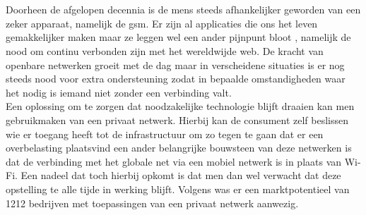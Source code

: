 
\chapter{}%
\label{ch:inleiding}

Doorheen de afgelopen decennia is de mens steeds afhankelijker geworden van een zeker apparaat, namelijk de gsm. Er zijn al applicaties die ons het leven gemakkelijker maken maar ze leggen wel een ander pijnpunt bloot , namelijk de nood om continu verbonden zijn met het wereldwijde web. De kracht van openbare netwerken groeit met de dag maar in verscheidene situaties is er nog steeds nood voor extra ondersteuning zodat in bepaalde omstandigheden waar het nodig is iemand niet zonder een verbinding valt. \\

Een oplossing om te zorgen dat noodzakelijke technologie blijft draaien kan men gebruikmaken van een privaat netwerk. Hierbij kan de consument zelf beslissen wie er toegang heeft tot de infrastructuur om zo tegen te gaan dat er een overbelasting plaatsvind een ander belangrijke bouwsteen van deze netwerken is dat de verbinding met het globale net via een mobiel netwerk is in plaats van Wi-Fi. Een nadeel dat toch hierbij opkomt is dat men dan wel verwacht dat deze opstelling te alle tijde in werking blijft. Volgens \textcite{Dux2023}  was er een marktpotentieel van 1212 bedrijven met toepassingen van een privaat netwerk aanwezig. 
\section{}%
\label{sec:probleemstelling}


